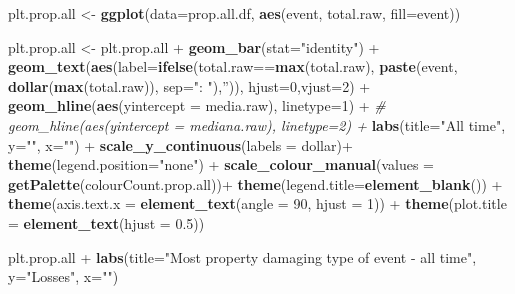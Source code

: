 \documentclass[]{article}
\newenvironment{Shaded}{\begin{snugshade}}{\end{snugshade}}
\newcommand{\KeywordTok}[1]{\textcolor[rgb]{0.13,0.29,0.53}{\textbf{{#1}}}}
\newcommand{\DataTypeTok}[1]{\textcolor[rgb]{0.13,0.29,0.53}{{#1}}}
\newcommand{\DecValTok}[1]{\textcolor[rgb]{0.00,0.00,0.81}{{#1}}}
\newcommand{\FloatTok}[1]{\textcolor[rgb]{0.00,0.00,0.81}{{#1}}}
\newcommand{\StringTok}[1]{\textcolor[rgb]{0.31,0.60,0.02}{{#1}}}
\newcommand{\CommentTok}[1]{\textcolor[rgb]{0.56,0.35,0.01}{\textit{{#1}}}}
\newcommand{\NormalTok}[1]{{#1}}
\begin{document}
\begin{Shaded}
\begin{Highlighting}[]
\NormalTok{plt.prop.all <-}\StringTok{ }\KeywordTok{ggplot}\NormalTok{(}\DataTypeTok{data=}\NormalTok{prop.all.df, }\KeywordTok{aes}\NormalTok{(event, total.raw, }\DataTypeTok{fill=}\NormalTok{event))}

\NormalTok{plt.prop.all <-}\StringTok{ }\NormalTok{plt.prop.all +}\StringTok{ }\KeywordTok{geom_bar}\NormalTok{(}\DataTypeTok{stat=}\StringTok{"identity"}\NormalTok{) +}
\StringTok{                }
\StringTok{        }\KeywordTok{geom_text}\NormalTok{(}\KeywordTok{aes}\NormalTok{(}\DataTypeTok{label=}\KeywordTok{ifelse}\NormalTok{(total.raw==}\KeywordTok{max}\NormalTok{(total.raw),}
                \KeywordTok{paste}\NormalTok{(event, }\KeywordTok{dollar}\NormalTok{(}\KeywordTok{max}\NormalTok{(total.raw)), }\DataTypeTok{sep=}\StringTok{": "}\NormalTok{),}\StringTok{''}\NormalTok{)),}
                \DataTypeTok{hjust=}\DecValTok{0}\NormalTok{,}\DataTypeTok{vjust=}\DecValTok{2}\NormalTok{) +}
\StringTok{        }\KeywordTok{geom_hline}\NormalTok{(}\KeywordTok{aes}\NormalTok{(}\DataTypeTok{yintercept =} \NormalTok{media.raw), }\DataTypeTok{linetype=}\DecValTok{1}\NormalTok{) +}
\StringTok{        }\CommentTok{# geom_hline(aes(yintercept = mediana.raw), linetype=2) +}
\StringTok{        }\KeywordTok{labs}\NormalTok{(}\DataTypeTok{title=}\StringTok{"All time"}\NormalTok{, }\DataTypeTok{y=}\StringTok{""}\NormalTok{, }\DataTypeTok{x=}\StringTok{""}\NormalTok{) +}\StringTok{ }
\StringTok{                }
\StringTok{        }\KeywordTok{scale_y_continuous}\NormalTok{(}\DataTypeTok{labels =} \NormalTok{dollar)+}
\StringTok{     }
\StringTok{        }\KeywordTok{theme}\NormalTok{(}\DataTypeTok{legend.position=}\StringTok{"none"}\NormalTok{) +}\StringTok{        }
\StringTok{        }\KeywordTok{scale_colour_manual}\NormalTok{(}\DataTypeTok{values =} \KeywordTok{getPalette}\NormalTok{(colourCount.prop.all))+}\StringTok{                }
\StringTok{        }\KeywordTok{theme}\NormalTok{(}\DataTypeTok{legend.title=}\KeywordTok{element_blank}\NormalTok{()) +}
\StringTok{        }\KeywordTok{theme}\NormalTok{(}\DataTypeTok{axis.text.x =} \KeywordTok{element_text}\NormalTok{(}\DataTypeTok{angle =} \DecValTok{90}\NormalTok{, }\DataTypeTok{hjust =} \DecValTok{1}\NormalTok{)) +}\StringTok{ }
\StringTok{        }\KeywordTok{theme}\NormalTok{(}\DataTypeTok{plot.title =} \KeywordTok{element_text}\NormalTok{(}\DataTypeTok{hjust =} \FloatTok{0.5}\NormalTok{))                 }

\NormalTok{plt.prop.all +}\StringTok{ }\KeywordTok{labs}\NormalTok{(}\DataTypeTok{title=}\StringTok{"Most property damaging type of event - all time"}\NormalTok{,}
                    \DataTypeTok{y=}\StringTok{"Losses"}\NormalTok{, }\DataTypeTok{x=}\StringTok{""}\NormalTok{)}
\end{Highlighting}
\end{Shaded}
\end{document}
